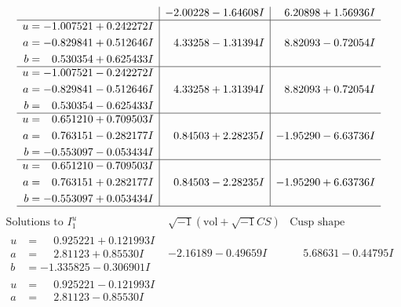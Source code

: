 \documentclass[1p]{elsarticle_modified}
\theoremstyle{definition}
\newcommand{\I}{\sqrt{-1}}
\begin{document}
$$\begin{array}{c|c|c}
 & -2.00228 - 1.64608 I & \phantom{-}6.20898 + 1.56936 I \\ \hline\begin{aligned}
u &= -1.007521 + 0.242272 I \\
a &= -0.829841 + 0.512646 I \\
b &= \phantom{-}0.530354 + 0.625433 I\end{aligned}
 & \phantom{-}4.33258 - 1.31394 I & \phantom{-}8.82093 - 0.72054 I \\ \hline\begin{aligned}
u &= -1.007521 - 0.242272 I \\
a &= -0.829841 - 0.512646 I \\
b &= \phantom{-}0.530354 - 0.625433 I\end{aligned}
 & \phantom{-}4.33258 + 1.31394 I & \phantom{-}8.82093 + 0.72054 I \\ \hline\begin{aligned}
u &= \phantom{-}0.651210 + 0.709503 I \\
a &= \phantom{-}0.763151 - 0.282177 I \\
b &= -0.553097 - 0.053434 I\end{aligned}
 & \phantom{-}0.84503 + 2.28235 I & -1.95290 - 6.63736 I \\ \hline\begin{aligned}
u &= \phantom{-}0.651210 - 0.709503 I \\
a &= \phantom{-}0.763151 + 0.282177 I \\
b &= -0.553097 + 0.053434 I\end{aligned}
 & \phantom{-}0.84503 - 2.28235 I & -1.95290 + 6.63736 I\\
 \hline 
 \end{array}$$\newpage$$\begin{array}{c|c|c}  
\text{Solutions to }I^u_{1}& \I (\text{vol} + \sqrt{-1}CS) & \text{Cusp shape}\\
 \hline 
\begin{aligned}
u &= \phantom{-}0.925221 + 0.121993 I \\
a &= \phantom{-}2.81123 + 0.85530 I \\
b &= -1.335825 - 0.306901 I\end{aligned}
 & -2.16189 - 0.49659 I & \phantom{-}5.68631 - 0.44795 I \\ \hline\begin{aligned}
u &= \phantom{-}0.925221 - 0.121993 I \\
a &= \phantom{-}2.81123 - 0.85530 I \\

\end{aligned}
\end{array}$$
\end{document}
